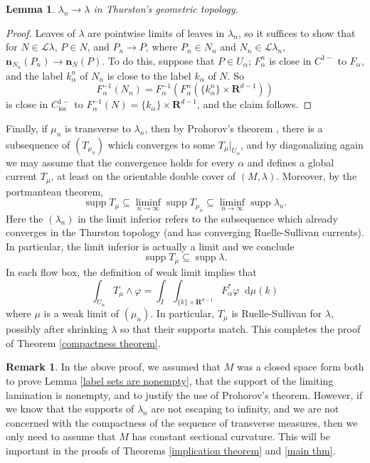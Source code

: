 \documentclass[reqno,11pt]{amsart}
\newcommand{\RR}{\mathbf{R}}
\newcommand*\dif{\mathop{}\!\mathrm{d}}
\DeclareMathOperator{\supp}{supp}
\newcommand{\Leaves}{\mathscr L}
\newcommand{\normal}{\mathbf n}
\newcommand{\loc}{\mathrm{loc}}
\newtheorem{lemma}[theorem]{Lemma}
\theoremstyle{definition}
\newtheorem{remark}[theorem]{Remark}
\numberwithin{equation}{section}
\begin{document}
\begin{lemma}
	$\lambda_n \to \lambda$ in Thurston's geometric topology.
\end{lemma}
\begin{proof}
Leaves of $\lambda$ are pointwise limits of leaves in $\lambda_n$, so it suffices to show that for $N \in \Leaves \lambda$, $P \in N$, and $P_n \to P$, where $P_n \in N_n$ and $N_n \in \Leaves \lambda_n$, $\normal_{N_n}(P_n) \to \normal_N(P)$.
To do this, suppose that $P \in U_\alpha$; $F_\alpha^n$ is close in $C^{1-}$ to $F_\alpha$, and the label $k^n_\alpha$ of $N_n$ is close to the label $k_\alpha$ of $N$.
So
$$F_\alpha^{-1}(N_n) = F_\alpha^{-1}(F_\alpha^n(\{k_\alpha^n\} \times \RR^{d - 1}))$$
is close in $C^{1-}_\loc$ to $F_\alpha^{-1}(N) = \{k_\alpha\} \times \RR^{d - 1}$, and the claim follows.
\end{proof}

Finally, if $\mu_n$ is transverse to $\lambda_n$, then by Prohorov's theorem \cite[Theorem 13.29]{klenke2013probability}, there is a subsequence of $(T_{\mu_n})$ which converges to some $T_\mu|_{U_\alpha}$, and by diagonalizing again we may assume that the convergence holds for every $\alpha$ and defines a global current $T_\mu$, at least on the orientable double cover of $(M, \lambda)$.
Moreover, by the portmanteau theorem,
$$\supp T_\mu \subseteq \liminf_{n \to \infty} \supp T_{\mu_n} \subseteq \liminf_{n \to \infty} \supp \lambda_n.$$
Here the $(\lambda_n)$ in the limit inferior refers to the subsequence which already converges in the Thurston topology (and has converging Ruelle-Sullivan currents).
In particular, the limit inferior is actually a limit and we conclude
$$\supp T_\mu \subseteq \supp \lambda.$$
In each flow box, the definition of weak limit implies that
$$\int_{U_\alpha} T_\mu \wedge \varphi = \int_I \int_{\{k\} \times \RR^{d - 1}} F_\alpha^* \varphi \dif \mu(k)$$
where $\mu$ is a weak limit of $(\mu_n)$.
In particular, $T_\mu$ is Ruelle-Sullivan for $\lambda$, possibly after shrinking $\lambda$ so that their supports match.
This completes the proof of Theorem \ref{compactness theorem}.

\begin{remark}\label{must M be a closed space form}
	In the above proof, we assumed that $M$ was a closed space form both to prove Lemma \ref{label sets are nonempty}, that the support of the limiting lamination is nonempty, and to justify the use of Prohorov's theorem.
	However, if we know that the supports of $\lambda_n$ are not escaping to infinity, and we are not concerned with the compactness of the sequence of transverse measures, then we only need to assume that $M$ has constant sectional curvature.
	This will be important in the proofs of Theorems \ref{implication theorem} and \ref{main thm}.
\end{remark}
\end{document}
